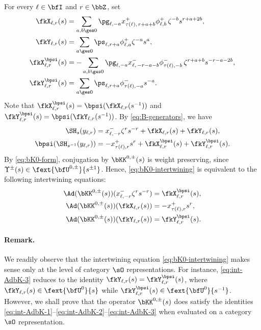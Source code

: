 \documentclass[reqno]{amsart}
\numberwithin{equation}{section}
\newenvironment{remark}{\medskip\paragraph{{\bf Remark.}}}{\par\medskip}
\begin{document}
For every $\ell\in\bfI$ and $r\in\bbZ$, set
\begin{equation}
\begin{aligned}
	\fkX_{\ell,r}(s)&=\sum_{a,b\ges 0}
	\pg_{\ell, -a}x^+_{\tau(\ell),\,r+a+b}\phi^+_{\ell,b}
	\,\zeta^{-b}s^{r+a+2b},\\
	\fkY_{\ell,r}(s)&=\sum_{a\ges 0}\ps_{\ell,r+a}\phi^+_{\ell,a}\zeta^{-a}s^a,\\
	\fkX^{\bpsi}_{\ell,r}(s)&=-\sum_{a,b\ges 0}
	\pg_{\ell,-a}x^-_{\ell,\,-r-a-b}\phi^-_{\tau(\ell),-b}
	\,\zeta^{r+a+b}s^{-r-a-2b},\\
	\fkY^\bpsi_{\ell,r}(s)&=\sum_{a\ges 0}\ps_{\ell,r+a} \phi^-_{\tau(\ell),-a}s^{-a}.
\end{aligned}
\end{equation}
Note that $\fkX_{\ell,r}^{\bpsi}(s)=\bpsi(\fkX_{\ell,r}(s^{-1}))$ and $\fkY_{\ell,r}^{\bpsi}(s)=\bpsi(\fkY_{\ell,r}(s^{-1}))$.
By \eqref{eq:B-generators}, we have
\begin{equation}
\begin{aligned}
	\SH_{s}(y_{\ell,r})&=
	x^-_{\ell,-r}\zeta^r s^{-r}
	+\fkX_{\ell,r}(s)
	+\fkY_{\ell,r}(s),\\
	\bpsi(\SH_{s^{-1}}(y_{\ell,r}))
	&=-x^+_{\tau(\ell),r}s^{r}
	+\fkX_{\ell,r}^{\bpsi}(s)
	+\fkY_{\ell,r}^{\bpsi}(s).
\end{aligned}
\end{equation}
By \eqref{eq:bK0-form}, conjugation by $\bKK^{0,\pm}(s)$ is weight preserving, since $\Upsilon^{\pm}(s)\in\fext{\bfU^{0,\pm}}{s^{\pm1}}$.
Hence, \eqref{eq:bK0-intertwining} is equivalent to the following intertwining equations:
\begin{align}
\label{eq:int-AdbK-1}
\Ad(\bKK^{0,\pm}(s))(x^-_{\ell,-r}\zeta^r s^{-r})&=\fkX^{\bpsi}_{\ell,r}(s),\\
\label{eq:int-AdbK-2}
\Ad(\bKK^{0,\pm}(s))(\fkX_{\ell,r}(s))&=-x^+_{\tau(\ell),r}s^{r},\\
\label{eq:int-AdbK-3}
\Ad(\bKK^{0,\pm}(s))(\fkY_{\ell,r}(s))&=\fkY^{\bpsi}_{\ell,r}(s).
\end{align}	

\begin{remark}
We readily observe that the intertwining equation \eqref{eq:bK0-intertwining}
makes sense only at the level of category $\sO$ representations. For instance, \eqref{eq:int-AdbK-3} reduces to the identity $\fkY_{\ell,r}(s)=\fkY^{\bpsi}_{\ell,r}(s)$, where $\fkY_{\ell,r}(s)\in\fext{\bfU^{0}}{s}$ while $\fkY^{\bpsi}_{\ell,r}(s)\in\fext{\bfU^{0}}{s^{-1}}$. However, we shall prove that
the operator $\bKK^{0,\pm}(s)$ does satisfy the identities
\eqref{eq:int-AdbK-1}--\eqref{eq:int-AdbK-2}--\eqref{eq:int-AdbK-3}
when evaluated on a category $\sO$ representation.
\hfill\rmkend
\end{remark}
\end{document}
